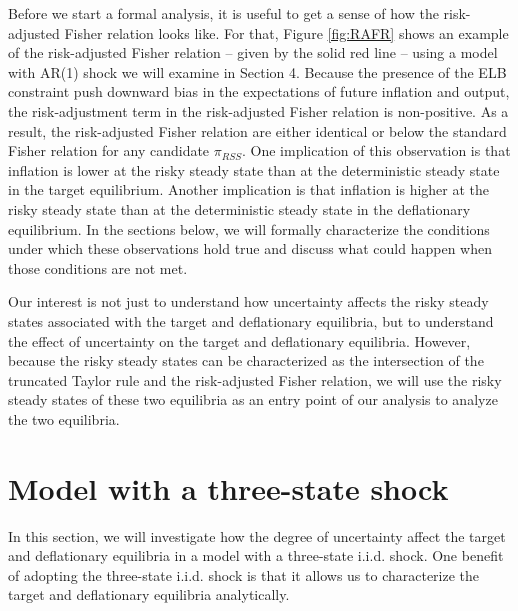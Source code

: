 \documentclass[11pt]{article}
\begin{document}
	Before we start a formal analysis, it is useful to get a sense of how the risk-adjusted Fisher relation looks like. For that, Figure \ref{fig:RAFR} shows an example of the risk-adjusted Fisher relation -- given by the solid red line -- using a model with AR(1) shock we will examine in Section 4. Because the presence of the ELB constraint push downward bias in the expectations of future inflation and output, the risk-adjustment term in the risk-adjusted Fisher relation is non-positive. As a result, the risk-adjusted Fisher relation are either identical or below the standard Fisher relation for any candidate $\pi_{RSS}$. One implication of this observation is that inflation is lower at the risky steady state than at the deterministic steady state in the target equilibrium. Another implication is that inflation is higher at the risky steady state than at the deterministic steady state in the deflationary equilibrium. In the sections below, we will formally characterize the conditions under which these observations hold true and discuss what could happen when those conditions are not met.
	
	Our interest is not just to understand how uncertainty affects the risky steady states associated with the target and deflationary equilibria, but to understand the effect of uncertainty on the target and deflationary equilibria. However, because the risky steady states can be characterized as the intersection of the truncated Taylor rule and the risk-adjusted Fisher relation, we will use the risky steady states of these two equilibria as an entry point of our analysis to analyze the two equilibria.
	
	
	
	
	\section{Model with a three-state shock}
	\label{S:Model3}
	
	In this section, we will investigate how the degree of uncertainty affect the target and deflationary equilibria in a model with a three-state i.i.d. shock. One benefit of adopting the three-state i.i.d. shock is that it allows us to characterize the target and deflationary equilibria analytically. 
	
\end{document}
